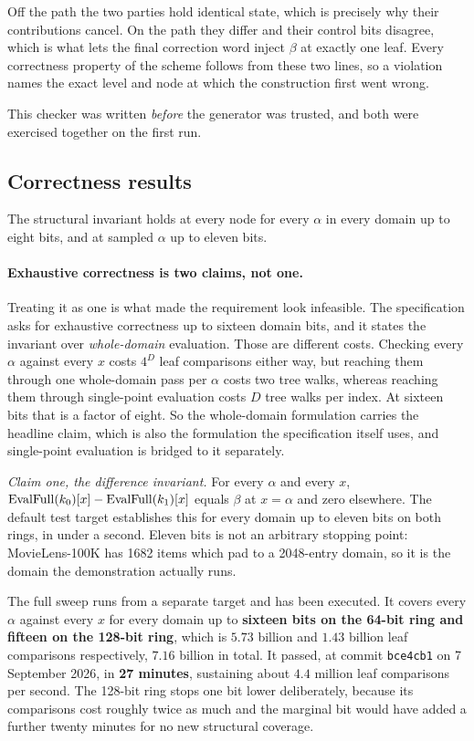 Off the path the two parties hold identical state, which is precisely why
their contributions cancel. On the path they differ and their control bits
disagree, which is what lets the final correction word inject $\beta$ at
exactly one leaf. Every correctness property of the scheme follows from these
two lines, so a violation names the exact level and node at which the
construction first went wrong.

This checker was written \emph{before} the generator was trusted, and both
were exercised together on the first run.

\subsection{Correctness results}
\label{sec:tech:dpf:results}

The structural invariant holds at every node for every $\alpha$ in every
domain up to eight bits, and at sampled $\alpha$ up to eleven bits.

\paragraph{Exhaustive correctness is two claims, not one.}
Treating it as one is what made the requirement look infeasible. The
specification asks for exhaustive correctness up to sixteen domain bits, and it
states the invariant over \emph{whole-domain} evaluation. Those are different
costs. Checking every $\alpha$ against every $x$ costs $4^{D}$ leaf comparisons
either way, but reaching them through one whole-domain pass per $\alpha$ costs
two tree walks, whereas reaching them through single-point evaluation costs $D$
tree walks per index. At sixteen bits that is a factor of eight. So the
whole-domain formulation carries the headline claim, which is also the
formulation the specification itself uses, and single-point evaluation is
bridged to it separately.

\emph{Claim one, the difference invariant.} For every $\alpha$ and every $x$,
$\operatorname{EvalFull}(k_0)[x] - \operatorname{EvalFull}(k_1)[x]$ equals $\beta$ at $x = \alpha$ and zero
elsewhere. The default test target establishes this for every domain up to
eleven bits on both rings, in under a second. Eleven bits is not an arbitrary
stopping point: MovieLens-100K has 1682 items which pad to a 2048-entry domain,
so it is the domain the demonstration actually runs.

The full sweep runs from a separate target and has been executed. It covers
every $\alpha$ against every $x$ for every domain up to \textbf{sixteen bits on
the 64-bit ring and fifteen on the 128-bit ring}, which is $5.73$ billion and
$1.43$ billion leaf comparisons respectively, $7.16$ billion in total. It
passed, at commit \texttt{bce4cb1} on 7 September 2026, in \textbf{27 minutes},
sustaining about $4.4$ million leaf comparisons per second. The 128-bit ring
stops one bit lower deliberately, because its comparisons cost roughly twice as
much and the marginal bit would have added a further twenty minutes for no new
structural coverage.

